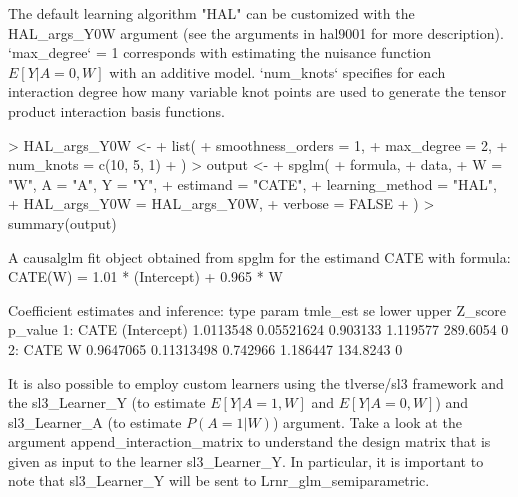 \documentclass[article]{jss}
\begin{document}
The default learning algorithm "HAL" can be customized with the HAL\_args\_Y0W argument (see the arguments in hal9001 for more description). `max\_degree` = 1 corresponds with estimating the nuisance function $E[Y|A=0,W]$ with an additive model. `num\_knots` specifies for each interaction degree how many variable knot points are used to generate the tensor product interaction basis functions. 

\begin{Schunk}
\begin{Sinput}
> HAL_args_Y0W <-
+   list(
+     smoothness_orders = 1,
+     max_degree = 2,
+     num_knots = c(10, 5, 1)
+   )
> output <-
+   spglm(
+     formula,
+     data,
+     W = "W", A = "A", Y = "Y",
+     estimand = "CATE",
+     learning_method = "HAL",
+     HAL_args_Y0W = HAL_args_Y0W,
+     verbose = FALSE
+   )
> summary(output)
\end{Sinput}
\begin{Soutput}
A causalglm fit object obtained from spglm for the estimand CATE with formula: 
CATE(W) = 1.01 * (Intercept) + 0.965 * W

Coefficient estimates and inference:
   type       param  tmle_est         se    lower    upper  Z_score p_value
1: CATE (Intercept) 1.0113548 0.05521624 0.903133 1.119577 289.6054       0
2: CATE           W 0.9647065 0.11313498 0.742966 1.186447 134.8243       0
\end{Soutput}
\end{Schunk}

It is also possible to employ custom learners using the tlverse/sl3 framework and the sl3\_Learner\_Y (to estimate $E[Y|A=1,W]$ and $E[Y|A=0,W]$) and sl3\_Learner\_A (to estimate $P(A=1|W)$) argument.
Take a look at the argument append\_interaction\_matrix to understand the design matrix that is given as input to the learner sl3\_Learner\_Y. In particular, it is important to note that sl3\_Learner\_Y will be sent to Lrnr\_glm\_semiparametric.
\end{document}
